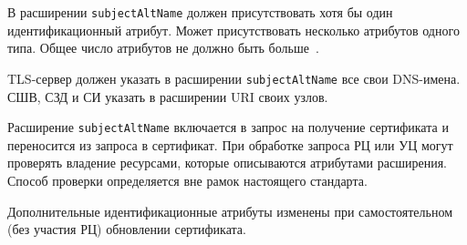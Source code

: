 В расширении \texttt{subjectAltName} должен присутствовать хотя бы один 
идентификационный атрибут. Может присутствовать несколько атрибутов одного 
типа. Общее число атрибутов не должно быть больше~.

TLS-сервер должен указать в расширении \texttt{subjectAltName}
все свои DNS-имена. СШВ, СЗД и СИ  указать в расширении 
URI своих узлов.

Расширение \texttt{subjectAltName} включается в запрос на получение сертификата 
и переносится из запроса в сертификат. При обработке запроса РЦ или УЦ 
могут проверять владение ресурсами, которые описываются атрибутами расширения. 
%
Способ проверки определяется вне рамок настоящего стандарта.

Дополнительные идентификационные атрибуты  
изменены при самостоятельном (без участия РЦ) обновлении сертификата.

